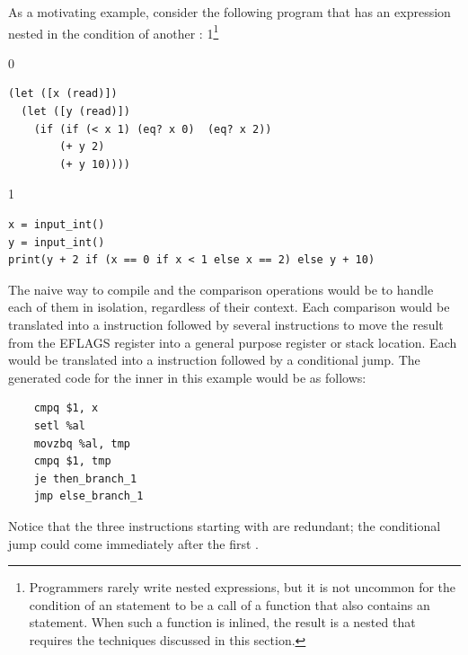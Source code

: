 \documentclass[7x10]{TimesAPriori_MIT}%
\def\racketEd{0}
\def\pythonEd{1}
\def\edition{1}
\newcommand{\pythonColor}[0]{}
\newcommand{\python}[1]{{\if\edition\pythonEd\pythonColor #1\fi}}
\numberwithin{theorem}{chapter}
\numberwithin{definition}{chapter}
\numberwithin{equation}{chapter}
\begin{document}
As a motivating example, consider the following program that has an
 expression nested in the condition of another :%
\python{\footnote{Programmers rarely write nested 
  expressions, but it is not uncommon for the condition of an
  \code{if} statement to be a call of a function that also contains an
  \code{if} statement.  When such a function is inlined, the result is
  a nested \code{if} that requires the techniques discussed in this
  section.}}
\begin{center}
\begin{minipage}{0.96\textwidth}
{\if\edition\racketEd        
\begin{lstlisting}
(let ([x (read)])
  (let ([y (read)])
    (if (if (< x 1) (eq? x 0)  (eq? x 2))
        (+ y 2)
        (+ y 10))))
\end{lstlisting}
\fi}
{\if\edition\pythonEd\pythonColor
\begin{lstlisting}
x = input_int()
y = input_int()
print(y + 2 if (x == 0 if x < 1 else x == 2) else y + 10)
\end{lstlisting}
\fi}
\end{minipage}
\end{center}
%
The naive way to compile  and the comparison operations would
be to handle each of them in isolation, regardless of their context.
Each comparison would be translated into a  instruction
followed by several instructions to move the result from the EFLAGS
register into a general purpose register or stack location. Each
 would be translated into a  instruction followed by
a conditional jump. The generated code for the inner  in this
example would be as follows:
\begin{center}
\begin{minipage}{0.96\textwidth}
\begin{lstlisting}
    cmpq $1, x
    setl %al
    movzbq %al, tmp
    cmpq $1, tmp
    je then_branch_1
    jmp else_branch_1
\end{lstlisting}
\end{minipage}
\end{center}
Notice that the three instructions starting with  are
redundant; the conditional jump could come immediately after the first
. 
\end{document}
